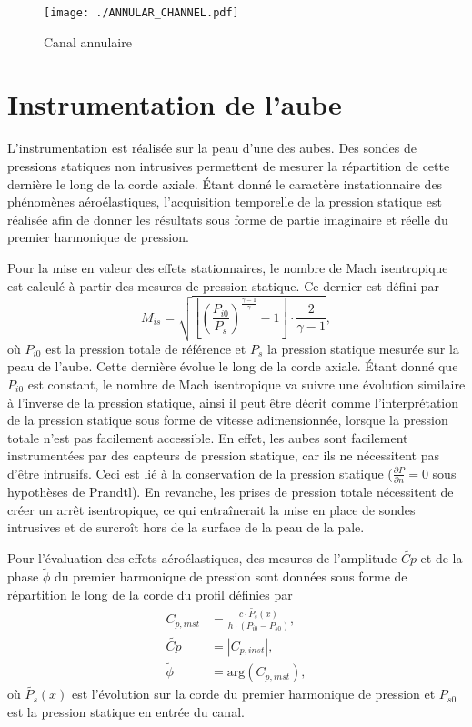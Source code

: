 \begin{figure}[htbp]
  \centering
  \texttt{[image: ./ANNULAR\_CHANNEL.pdf]}
  \caption{Canal annulaire}
  \label{fig:canal_annulaire}
\end{figure}


\section{Instrumentation de l'aube}

L'instrumentation est réalisée sur la peau d'une des aubes.
Des sondes de pressions statiques non intrusives permettent
de mesurer la répartition de cette dernière 
le long de la corde axiale. Étant donné le caractère instationnaire
des phénomènes aéroélastiques, l'acquisition temporelle de la pression
statique est réalisée afin de donner les résultats sous forme de partie imaginaire
et réelle du premier harmonique de pression.

Pour la mise en valeur des effets stationnaires, le nombre de Mach isentropique est 
calculé à partir des mesures de pression statique. Ce dernier est défini par
% 
\begin{equation}
  M_{is} = \sqrt{\left[\left(\frac{P_{i0}}{P_s}\right)^{\frac{\gamma - 1}{\gamma}} - 1 \right] \cdot \frac{2}{\gamma -1}},
  \label{eq:mach_isentropique}
\end{equation}
% 
où $P_{i0}$ est la pression totale de référence et $P_s$ la pression statique
mesurée sur la peau de l'aube. Cette dernière évolue le long de la corde axiale.
Étant donné que $P_{i0}$ est constant, le nombre de Mach isentropique va suivre une
évolution similaire à l'inverse de la pression statique, ainsi il peut être
décrit comme l'interprétation de la pression statique sous forme de vitesse
adimensionnée, lorsque la pression totale n'est pas facilement accessible. En effet,
les aubes sont facilement instrumentées par des capteurs de pression statique, car ils 
ne nécessitent pas d'être intrusifs. Ceci est lié à la conservation de la
pression statique ($\frac{\partial P}{\partial n} = 0$ sous hypothèses de Prandtl). En revanche,
les prises de pression totale nécessitent de créer un arrêt isentropique, ce qui 
entraînerait la mise en place de sondes intrusives et de surcroît hors de la surface de
la peau de la pale.

Pour l'évaluation des effets aéroélastiques, des mesures de l'amplitude $\widetilde{Cp}$ et de la
phase $\widetilde{\phi}$ du premier harmonique de pression sont données sous forme de répartition
le long de la corde du profil définies par
% 
\begin{equation}
  \begin{split}
    C_{p, inst} &= \frac{c \cdot \widetilde{P_s}(x)}{h \cdot (P_{i0} - P_{s0})}, \\
    \widetilde{Cp} &= |C_{p, inst}|, \\
    \widetilde{\phi} &= \textrm{arg}(C_{p, inst}),
  \end{split}
  \label{eq:cp_inst}
\end{equation}
% 
où $\widetilde{P_s}(x)$ est l'évolution sur la corde du premier harmonique de pression
et $P_{s0}$ est la pression statique en entrée du canal.

